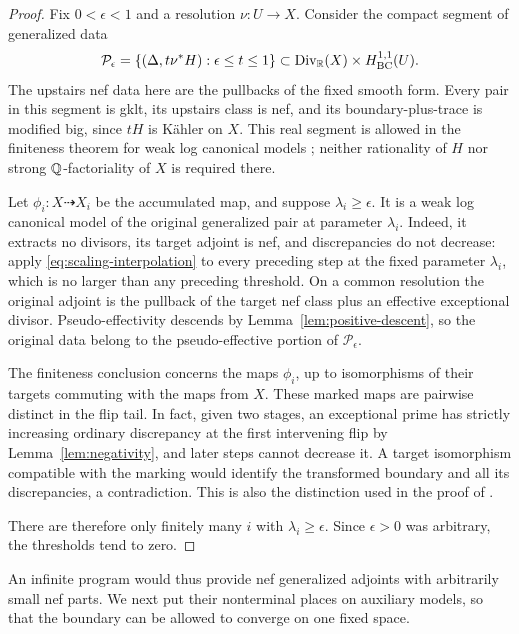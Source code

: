 \begin{proof}
Fix \(0<\epsilon<1\) and a resolution \(\nu:U\to X\).  Consider the
compact segment of generalized data
\[
 \mathcal P_\epsilon
 =\{(\Delta,t\nu^*H):\epsilon\leq t\leq1\}
 \subset \operatorname{Div}_{\mathbb R}(X)\times H^{1,1}_{\mathrm{BC}}(U).
\]
The upstairs nef data here are the pullbacks of the fixed smooth form.
Every pair in this segment is gklt, its upstairs class is nef, and its
boundary-plus-trace is modified big, since \(tH\) is Kähler on \(X\).
This real segment is allowed in the finiteness theorem for weak log
canonical models \cite[Theorem~5.15]{HX2026}; neither rationality of
\(H\) nor strong \(\mathbb Q\)-factoriality of \(X\) is required there.

Let \(\phi_i:X\dashrightarrow X_i\) be the accumulated map, and
suppose \(\lambda_i\geq\epsilon\).  It is a weak log canonical
model of the original generalized pair at parameter \(\lambda_i\).
Indeed, it extracts no divisors, its target adjoint is nef, and
discrepancies do not decrease: apply
\eqref{eq:scaling-interpolation} to every preceding step at the fixed
parameter \(\lambda_i\), which is no larger than any preceding
threshold.  On a common resolution the original adjoint is the
pullback of the target nef class plus an effective exceptional
divisor.  Pseudo-effectivity descends by
Lemma~\ref{lem:positive-descent}, so the original data belong to the
pseudo-effective portion of \(\mathcal P_\epsilon\).

The finiteness conclusion concerns the maps \(\phi_i\), up to
isomorphisms of their targets commuting with the maps from \(X\).
These marked maps are pairwise distinct in the flip tail.  In fact,
given two stages, an exceptional prime has strictly increasing
ordinary discrepancy at the first intervening flip by
Lemma~\ref{lem:negativity}, and later steps
cannot decrease it.  A target isomorphism compatible with the marking
would identify the transformed boundary and all its discrepancies,
a contradiction.  This is also the distinction used in the proof of
\cite[Theorem~5.16]{HX2026}.

There are therefore only finitely many \(i\) with
\(\lambda_i\geq\epsilon\).  Since \(\epsilon>0\) was arbitrary,
the thresholds tend to zero.
\end{proof}

An infinite program would thus provide nef generalized adjoints with
arbitrarily small nef parts.  We next put their nonterminal places on
auxiliary models, so that the boundary can be allowed to converge on
one fixed space.

